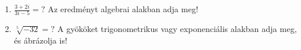 \documentclass[11pt]{scrartcl}
\begin{document}
\begin{enumerate}
	\item \(\displaystyle
	      \frac{3 + 2i}{3i - 5} = ?
	      \) Az eredményt algebrai alakban adja meg!

	\item $\sqrt[5]{-32} = ?$ A gyököket trigonometrikus vagy exponenciális
	      alakban adja meg, és ábrázolja is!
\end{enumerate}
\end{document}
